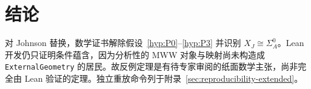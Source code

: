 \section{结论}

对 Johnson 替换，数学证书解除假设~\ref{hyp:P0}--\ref{hyp:P3} 并识别 $X_J\cong\Sigma_A^0$。Lean 开发仍只证明条件蕴含，因为分析性的 MWW 对象与映射尚未构造成 \texttt{ExternalGeometry} 的居民。故反例定理是有待专家审阅的纸面数学主张，尚非完全由 Lean 验证的定理。独立重放命令列于附录~\ref{sec:reproducibility-extended}。
